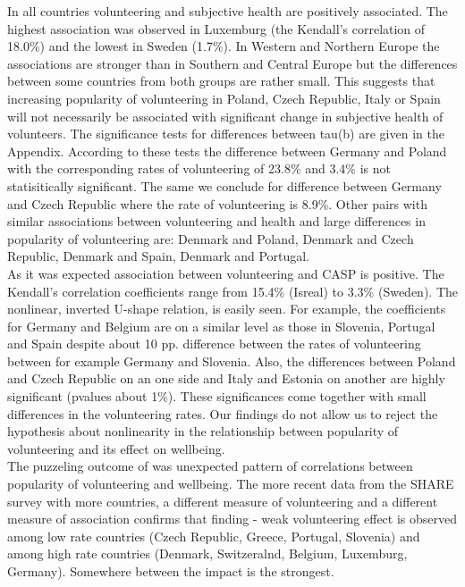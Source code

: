 \documentclass[10pt, letterpaper]{article}
\begin{document}
\begin{spacing}{1.4}
%


In all countries volunteering and subjective health are positively associated. The highest association was observed in Luxemburg (the Kendall's correlation of 18.0\%) and the lowest in Sweden (1.7\%). In Western and Northern Europe the associations are stronger than in Southern and Central Europe but the differences between some countries from both groups are rather small. This suggests that increasing popularity of volunteering in Poland, Czech Republic, Italy or Spain will not necessarily be associated with significant change in subjective health of volunteers. The significance tests for differences between tau(b) are given in the Appendix. According to these tests the difference between Germany and Poland with the corresponding rates of volunteering of 23.8\% and 3.4\% is not statisitically significant. The same we conclude for difference between Germany and Czech Republic where the rate of volunteering is 8.9\%. Other pairs with similar associations between volunteering and health and large differences in popularity of volunteering are: Denmark and Poland, Denmark and Czech Republic, Denmark and Spain, Denmark and Portugal.  \\


As it was expected association between volunteering and CASP  is positive. The Kendall's correlation coefficients range from 15.4\% (Isreal) to 3.3\% (Sweden).  The nonlinear, inverted U-shape relation, is easily seen. For example, the coefficients for Germany and Belgium are on a similar level as those in Slovenia, Portugal and Spain despite about 10 pp. difference between the rates of volunteering between for example Germany and Slovenia. Also, the differences between Poland and Czech Republic on an one side and Italy and Estonia on another are highly significant (pvalues about 1\%). These significances come together with small differences in the volunteering rates. Our findings do not allow us to reject the hypothesis about nonlinearity in the relationship between popularity of volunteering and its effect on wellbeing. \\

The puzzeling outcome of \citet{haski09} was unexpected pattern of correlations between  popularity of volunteering and wellbeing.  The more recent data from the SHARE survey with more countries, a different measure of volunteering and a different measure of association confirms that finding - weak volunteering effect is observed among low rate countries (Czech Republic, Greece, Portugal, Slovenia) and among high rate countries (Denmark, Switzeralnd, Belgium, Luxemburg, Germany). Somewhere between the impact is the strongest. \\


\end{spacing}
\end{document}
